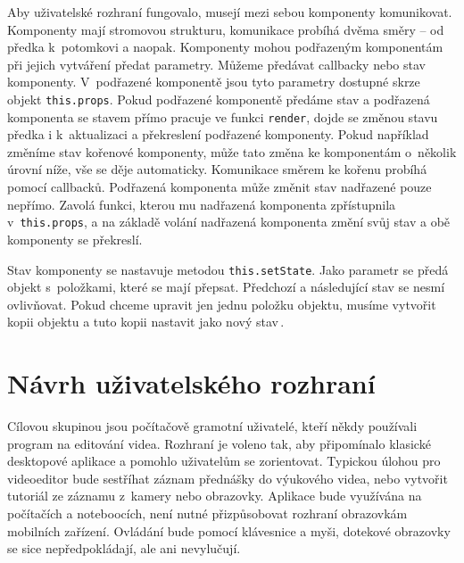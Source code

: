 Aby uživatelské rozhraní fungovalo, musejí mezi sebou komponenty komunikovat. Komponenty mají stromovou strukturu, komunikace probíhá dvěma směry -- od předka k~potomkovi a naopak. Komponenty mohou podřazeným komponentám při jejich vytváření předat parametry. Můžeme předávat callbacky nebo stav komponenty. V~podřazené komponentě jsou tyto parametry dostupné skrze objekt \texttt{this.props}. Pokud podřazené komponentě předáme stav a podřazená komponenta se stavem přímo pracuje ve funkci \texttt{render}, dojde se změnou stavu předka i k~aktualizaci a překreslení podřazené komponenty. Pokud například změníme stav kořenové komponenty, může tato změna  ke komponentám o~několik úrovní níže, vše se děje automaticky. Komunikace směrem ke kořenu probíhá pomocí callbacků. Podřazená komponenta může změnit stav nadřazené pouze nepřímo. Zavolá funkci, kterou mu nadřazená komponenta zpřístupnila v~\texttt{this.props}, a na základě volání nadřazená komponenta změní svůj stav a obě komponenty se překreslí.

Stav komponenty se nastavuje metodou \texttt{this.setState}. Jako parametr se předá objekt s~položkami, které se mají přepsat. Předchozí a následující stav se nesmí ovlivňovat. Pokud chceme upravit jen jednu položku objektu, musíme vytvořit kopii objektu a tuto kopii nastavit jako nový stav\,\cite{react}.

\section{Návrh uživatelského rozhraní}\label{cap:specification}
Cílovou skupinou jsou počítačově gramotní uživatelé, kteří někdy používali program na editování videa. Rozhraní je voleno tak, aby připomínalo klasické desktopové aplikace a pomohlo uživatelům se zorientovat. Typickou úlohou pro videoeditor bude sestříhat záznam přednášky do výukového videa, nebo vytvořit tutoriál ze záznamu z~kamery nebo obrazovky. Aplikace bude využívána na počítačích a noteboocích, není nutné přizpůsobovat rozhraní obrazovkám mobilních zařízení. Ovládání bude pomocí klávesnice a myši, dotekové obrazovky se sice nepředpokládají, ale ani nevylučují.

